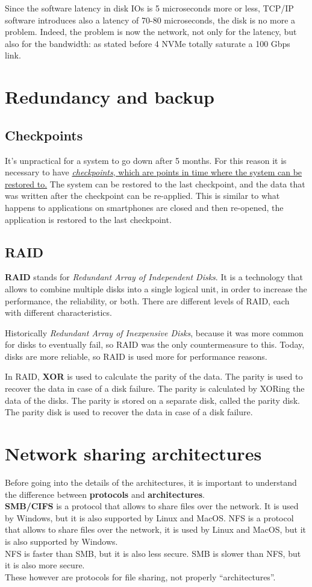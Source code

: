 Since the software latency in disk IOs is 5 microseconds more or less,
TCP/IP software introduces also a latency of 70-80 microseconds, the disk is
no more a problem. Indeed, the problem is now the network, not only for the
latency, but also for the bandwidth: as stated before 4 NVMe totally saturate a 100 Gbps
link.

\section{Redundancy and backup}
\subsection{Checkpoints}
It's unpractical for a system to go down after 5 months. For this reason it is necessary to have \ul{\textit{checkpoints}, which are points in time where the system can be restored to.} The system can be restored to the last checkpoint, and the data that was written after the checkpoint can be re-applied. This is similar to what happens to applications on smartphones are closed and then re-opened, the application is restored to the last checkpoint.

\subsection{RAID}
\textbf{RAID} stands for \textit{Redundant Array of Independent Disks}. It is a technology that allows to combine multiple disks into a single logical unit, in order to increase the performance, the reliability, or both. There are different levels of RAID, each with different characteristics.

Historically \textit{Redundant Array of Inexpensive Disks}, because it was more common for disks to eventually fail, so RAID was the only countermeasure to this. Today, disks are more reliable, so RAID is used more for performance reasons.

In RAID, \textbf{XOR} is used to calculate the parity of the data. The parity is used to recover the data in case of a disk failure. The parity is calculated by XORing the data of the disks. The parity is stored on a separate disk, called the parity disk. The parity disk is used to recover the data in case of a disk failure.


\section{Network sharing architectures}
Before going into the details of the architectures, it is important to understand the difference between \textbf{protocols} and \textbf{architectures}.\\
\textbf{SMB/CIFS} is a protocol that allows to share files over the network. It is used by Windows, but it is also supported by Linux and MacOS. NFS is a protocol that allows to share files over the network, it is used by Linux and MacOS, but it is also supported by Windows.\\
NFS is faster than SMB, but it is also less secure. SMB is slower than NFS, but it is also more secure.\\
These however are protocols for file sharing, not properly ``architectures''.

